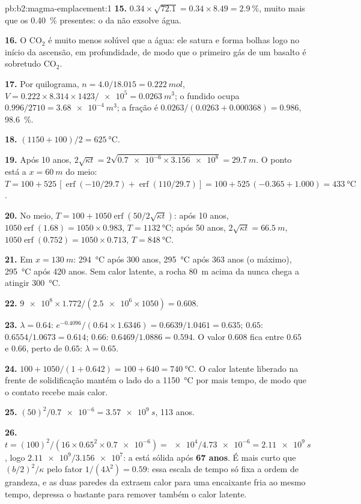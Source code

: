 \begin{solution}{pb:b2:magma-emplacement:1}
\textbf{15.} $0.34\times\sqrt{72.1} = 0.34\times8.49 = \qty{2.9}{\percent}$, muito mais que
os \qty{0.40}{\percent} presentes: o  da  não exsolve água.

\textbf{16.} O CO$_2$ é muito menos solúvel que a água: ele satura e forma bolhas
logo no início da ascensão, em profundidade, de modo que o primeiro gás de um basalto é sobretudo CO$_2$.

\textbf{17.} Por quilograma, $n = 4.0/18.015 = \qty{0.222}{mol}$, $V = 0.222\times8.314\times1423/
\num{e5} = \qty{0.0263}{m^3}$; o fundido ocupa $0.996/2710 = \qty{3.68e-4}{m^3}$; a
fração é $0.0263/(0.0263 + 0.000368) = 0.986$, \qty{98.6}{\percent}.

\textbf{18.} $(1150 + 100)/2 = \qty{625}{\celsius}$.

\textbf{19.} Após 10 anos, $2\sqrt{\kappa t} = 2\sqrt{\num{0.7e-6}\times\num{3.156e8}} =
\qty{29.7}{m}$. O ponto está a $x = \qty{60}{m}$ do meio: $T = 100 +
525\,[\operatorname{erf}(-10/29.7) + \operatorname{erf}(110/29.7)] = 100 + 525\,(-0.365 +
1.000) = \qty{433}{\celsius}$.

\textbf{20.} No meio, $T = 100 + 1050\operatorname{erf}(50/2\sqrt{\kappa t})$: após
10 anos, $1050\operatorname{erf}(1.68) = 1050\times0.983$, $T = \qty{1132}{\celsius}$; após
50 anos, $2\sqrt{\kappa t} = \qty{66.5}{m}$, $1050\operatorname{erf}(0.752) = 1050\times0.713$,
$T = \qty{848}{\celsius}$.

\textbf{21.} Em $x = \qty{130}{m}$: \qty{294}{\celsius} após 300 anos,
\qty{295}{\celsius} após 363 anos (o máximo), \qty{295}{\celsius} após 420
anos. Sem calor latente, a rocha \qty{80}{m} acima da  nunca chega a atingir
\qty{300}{\celsius}.

\textbf{22.} $\num{9e8}\times1.772/(\num{2.5e6}\times1050) = 0.608$.

\textbf{23.} $\lambda = 0.64$: $e^{-0.4096}/(0.64\times1.6346) = 0.6639/1.0461 = 0.635$;
$0.65$: $0.6554/1.0673 = 0.614$; $0.66$: $0.6469/1.0886 = 0.594$. O valor $0.608$
fica entre $0.65$ e $0.66$, perto de $0.65$: $\lambda = 0.65$.

\textbf{24.} $100 + 1050/(1 + 0.642) = 100 + 640 = \qty{740}{\celsius}$. O calor
latente liberado na frente de solidificação mantém o lado do  a
\qty{1150}{\celsius} por mais tempo, de modo que o contato recebe mais calor.

\textbf{25.} $(50)^2/\num{0.7e-6} = \qty{3.57e9}{s}$, 113 anos.

\textbf{26.} $t = (100)^2/(16\times0.65^2\times\num{0.7e-6}) = \num{e4}/\num{4.73e-6} =
\qty{2.11e9}{s}$, logo $\num{2.11e9}/\num{3.156e7}$: a  está sólida após
\textbf{\qty[text-series-to-math=true]{67}{} anos}. É mais curto que
$(b/2)^2/\kappa$ pelo fator $1/(4\lambda^2) = 0.59$: essa escala de tempo só fixa
a ordem de grandeza, e as duas paredes da  extraem calor para uma encaixante fria ao
mesmo tempo, depressa o bastante para remover também o calor latente.
\end{solution}
